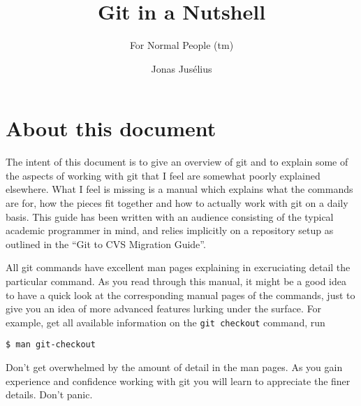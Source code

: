 \documentclass[a4paper,10pt]{article}
\begin{document}
\pagestyle{fancy}
\fancyfoot{}
\fancyhead{}
\renewcommand{\sectionmark}[1]{\markboth{\sf\thesection.\ #1}{}}
\renewcommand{\subsectionmark}[1]{}
\fancyhead[R]{{\rmfamily\thepage}}
\newcommand{\Ref}[1]{section~\ref{#1}, p.~\pageref{#1}}

\title{Git in a Nutshell}

\subtitle{For Normal People (tm)}
\author{{\sf Jonas Jus\'elius}}
\address{
{\tt <jonas.juselius@chem.uit.no>}\\
{\sf Centre for Theoretical and Computational Chemistry}\\
{\sf University of Tromsø}\\
{\sf N-9037 University of Tromsø, Norway}
}


\maketitle
\tableofcontents
\newpage

\section*{About this document}
The intent of this document is to give an overview of git and to explain some of
the aspects of working with git that I feel are somewhat poorly explained
elsewhere. 
What I feel is missing is a manual which explains what the commands are for,
how the pieces fit together and how to actually work with git on a daily
basis. This guide has been written with an audience consisting of the typical
academic programmer in mind, and relies implicitly on a repository setup as
outlined in the ``Git to CVS Migration Guide''.

All git commands have excellent man pages explaining in
excruciating detail the particular command. As you read through this manual,
it might be a good idea to have a quick look at the corresponding manual pages of
the commands, just to give you an idea of more advanced features lurking under
the surface. For example, get all available information on the
\texttt{git checkout} command, run
\begin{verbatim}
$ man git-checkout
\end{verbatim}
Don't get overwhelmed by the amount of detail in the man pages. As
you gain experience and confidence working with git you will learn to
appreciate the finer details. Don't panic.
\end{document}
